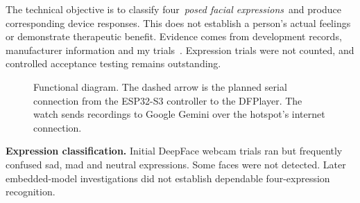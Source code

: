 \documentclass[conference,letterpaper]{IEEEtran}
\begin{document}
The technical objective is to classify four\ \emph{posed facial expressions}\ and produce corresponding device responses.
This does not establish a person's actual feelings or demonstrate
therapeutic benefit. Evidence comes from development records,
manufacturer information and my trials~\cite{records,updates}. Expression trials were not
counted, and controlled acceptance testing remains outstanding.

\begin{figure}[!t]\centering
{}

\caption{Functional diagram. The dashed arrow is the planned serial
connection from the ESP32-S3 controller to the DFPlayer.
The watch sends recordings to Google Gemini over the hotspot's
internet connection.}


\label{fig:system}\end{figure}

\textbf{Expression classification.}
Initial DeepFace webcam trials ran but frequently confused sad,
mad and neutral expressions. Some faces were not detected.
Later embedded-model investigations did not establish dependable
four-expression recognition.
\end{document}
